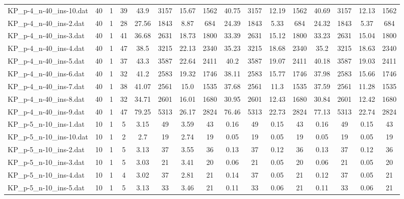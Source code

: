 \begin{sidewaystable}[!ht]
{\begin{tabular}{lccccccccccccccc}
KP\_p-4\_n-40\_ins-10.dat & 40 & 1 & 39 & 43.9 & 3157 & 15.67 & 1562 & 40.75 & 3157 & 12.19 & 1562 & 40.69 & 3157 & 12.13 & 1562 \\
KP\_p-4\_n-40\_ins-2.dat & 40 & 1 & 28 & 27.56 & 1843 & 8.87 & 684 & 24.39 & 1843 & 5.33 & 684 & 24.32 & 1843 & 5.37 & 684 \\
KP\_p-4\_n-40\_ins-3.dat & 40 & 1 & 41 & 36.68 & 2631 & 18.73 & 1800 & 33.39 & 2631 & 15.12 & 1800 & 33.23 & 2631 &  \textcolor{blue2}{15.04} & 1800 \\
KP\_p-4\_n-40\_ins-4.dat & 40 & 1 & 47 & 38.5 & 3215 & 22.13 & 2340 & 35.23 & 3215 & 18.68 & 2340 & 35.2 & 3215 & 18.63 & 2340 \\
KP\_p-4\_n-40\_ins-5.dat & 40 & 1 & 37 & 43.3 & 3587 & 22.64 & 2411 & 40.2 & 3587 & 19.07 & 2411 & 40.18 & 3587 & 19.03 & 2411 \\
KP\_p-4\_n-40\_ins-6.dat & 40 & 1 & 32 & 41.2 & 2583 & 19.32 & 1746 & 38.11 & 2583 & 15.77 & 1746 & 37.98 & 2583 &  \textcolor{blue2}{15.66} & 1746 \\
KP\_p-4\_n-40\_ins-7.dat & 40 & 1 & 38 & 41.07 & 2561 & 15.0 & 1535 & 37.68 & 2561 & 11.3 & 1535 & 37.59 & 2561 & 11.28 & 1535 \\
KP\_p-4\_n-40\_ins-8.dat & 40 & 1 & 32 & 34.71 & 2601 & 16.01 & 1680 & 30.95 & 2601 & 12.43 & 1680 & 30.84 & 2601 & 12.42 & 1680 \\
KP\_p-4\_n-40\_ins-9.dat & 40 & 1 & 47 & 79.25 & 5313 & 26.17 & 2824 & 76.46 & 5313 & 22.73 & 2824 & 77.13 & 5313 & 22.74 & 2824 \\
KP\_p-5\_n-10\_ins-1.dat & 10 & 1 & 5 & 3.15 & 49 & 3.59 & 43 & 0.16 & 49 &  \textcolor{blue2}{0.15} & 43 & 0.16 & 49 &  \textcolor{blue2}{0.15} & 43 \\
KP\_p-5\_n-10\_ins-10.dat & 10 & 1 & 2 & 2.7 & 19 & 2.74 & 19 &  \textcolor{blue2}{0.05} & 19 &  \textcolor{blue2}{0.05} & 19 &  \textcolor{blue2}{0.05} & 19 &  \textcolor{blue2}{0.05} & 19 \\
KP\_p-5\_n-10\_ins-2.dat & 10 & 1 & 5 & 3.13 & 37 & 3.55 & 36 & 0.13 & 37 &  \textcolor{blue2}{0.12} & 36 & 0.13 & 37 &  \textcolor{blue2}{0.12} & 36 \\
KP\_p-5\_n-10\_ins-3.dat & 10 & 1 & 5 & 3.03 & 21 & 3.41 & 20 & 0.06 & 21 &  \textcolor{blue2}{0.05} & 20 & 0.06 & 21 &  \textcolor{blue2}{0.05} & 20 \\
KP\_p-5\_n-10\_ins-4.dat & 10 & 1 & 4 & 3.02 & 37 & 2.81 & 21 & 0.14 & 37 &  \textcolor{blue2}{0.05} & 21 & 0.12 & 37 &  \textcolor{blue2}{0.05} & 21 \\
KP\_p-5\_n-10\_ins-5.dat & 10 & 1 & 5 & 3.13 & 33 & 3.46 & 21 & 0.11 & 33 &  \textcolor{blue2}{0.06} & 21 & 0.11 & 33 &  \textcolor{blue2}{0.06} & 21 \\

\end{tabular}}
\end{sidewaystable}
